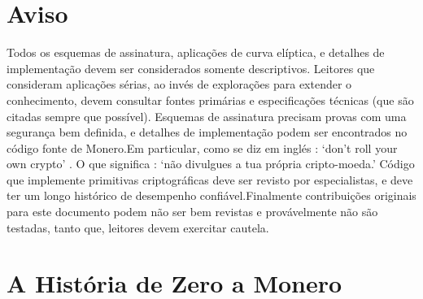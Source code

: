 


\section{Aviso}
Todos os esquemas de assinatura, aplicações de curva elíptica, e detalhes de  implementação devem ser considerados somente descriptivos. Leitores que consideram aplicações sérias, ao invés de explorações para extender o conhecimento, devem consultar fontes primárias e especificações técnicas (que são citadas sempre que possível).
Esquemas de assinatura precisam provas com uma segurança bem definida, e detalhes de implementação podem ser encontrados no código fonte de Monero.\newline Em particular, como se diz em inglés : `don't roll your own crypto' . O que significa : `não divulgues a tua própria cripto-moeda.' Código que implemente primitivas criptográficas deve ser revisto por especialistas, e deve ter um longo histórico de desempenho confiável.\newline Finalmente contribuições originais para este documento podem não ser bem revistas e provávelmente não são testadas, tanto que, leitores devem exercitar cautela.    
\section{A História de Zero a Monero}


